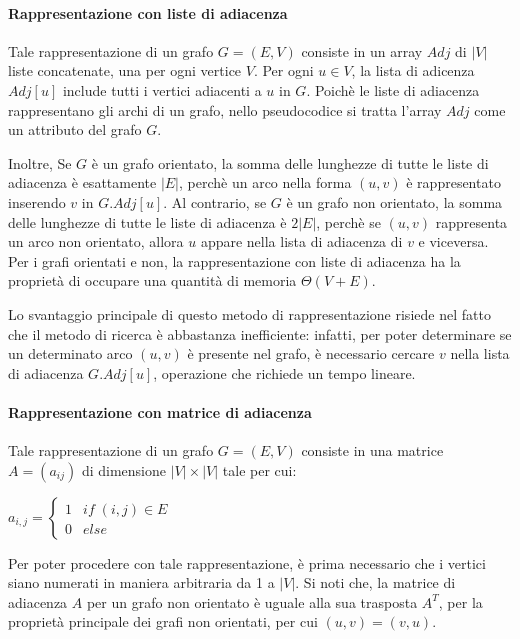 \paragraph{Rappresentazione con liste di adiacenza} Tale rappresentazione di un grafo \(G=(E,V)\) consiste in un array \(Adj\) di \(|V|\) liste concatenate, una per ogni vertice \(V\). Per ogni \(u\in V\), la lista di adicenza \(Adj[u]\) include tutti i vertici adiacenti a \(u\) in \(G\). Poichè le liste di adiacenza rappresentano gli archi di un grafo, nello pseudocodice si tratta l'array \(Adj\) come un attributo del grafo \(G\). 

Inoltre, Se \(G\) è un grafo orientato, la somma delle lunghezze di tutte le liste di adiacenza è esattamente \(|E|\), perchè un arco nella forma \((u,v)\) è rappresentato inserendo \(v\) in \(G.Adj[u]\). Al contrario, se \(G\) è un grafo non orientato, la somma delle lunghezze di tutte le liste di adiacenza è \(2|E|\), perchè se \((u,v)\) rappresenta un arco non orientato, allora \(u\) appare nella lista di adiacenza di \(v\) e viceversa. Per i grafi orientati e non, la rappresentazione con liste di adiacenza ha la proprietà di occupare una quantità di memoria \(\Theta(V+E)\). 

Lo svantaggio principale di questo metodo di rappresentazione risiede nel fatto che il metodo di ricerca è abbastanza inefficiente: infatti, per poter determinare se un determinato arco \((u,v)\) è presente nel grafo, è necessario cercare \(v\) nella lista di adiacenza \(G.Adj[u]\), operazione che richiede un tempo lineare.

\paragraph{Rappresentazione con matrice di adiacenza} Tale rappresentazione di un grafo \(G=(E,V)\) consiste in una matrice \(A =(a_{ij})\) di dimensione \(|V|\times |V|\) tale per cui:

\(
  a_{i,j} = 
  \begin{cases}
    1 & if\;(i, j)\in E\\
    0 & else  
  \end{cases}
\)

Per poter procedere con tale rappresentazione, è prima necessario che i vertici siano numerati in maniera arbitraria da 1 a \(|V|\). Si noti che, la matrice di adiacenza \(A\) per un grafo non orientato è uguale alla sua trasposta \(A^T\), per la proprietà principale dei grafi non orientati, per cui \((u,v) = (v,u)\).


